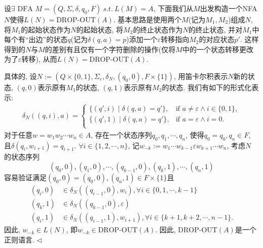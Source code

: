 \documentclass[11pt]{article}
\newenvironment{answer}[1][Answer]{\begin{trivlist}
\item[\hskip \labelsep{\bfseries\itshape#1.}\hskip \labelsep]}{\hfill$\lhd$\end{trivlist}}
\begin{document}
\begin{answer}
    设$\exists \text{ DFA } M = (Q, \Sigma, \delta, q_0, F) ~s.t.~ L(M) = A$, 下面我们从$M$出发构造一个NFA $N$使得$L(N) = \text{DROP-OUT}(A)$. 
    基本思路是使用两个$M$(记为$M_1, M_2$)组成$N$, 将$M_1$的起始状态作为$N$的起始状态, 将$M_2$的终止状态作为$N$的终止状态, 并对$M_1$中每个有“出边”的状态$q$(记为$\delta(q, a) = p$)添加一个$\varepsilon$转移指向$M_2$的对应状态$p'$.
    这样得到的$N$与$M$的差别有且仅有一个字符删除的操作(仅将$M$中的一个状态转移更改为了$\varepsilon$转移), 从而$L(N) = \text{DROP-OUT}(A)$. 
    
    具体的, 设$N := (Q \times \{0,1\}, \Sigma_{\varepsilon}, \delta_N, (q_0, 0), F \times \{1\})$, 用笛卡尔积表示$N$新的状态, $(q, 0)$表示原有$M_1$的状态, $(q, 1)$表示原有$M_2$的状态. 我们有如下的形式化表示:
    \begin{align*}
        \delta_N\left((q,i), a\right) = \begin{cases}
            \{(q', i)\mid \delta(q, a) = q'\}, & \text{if } a \neq \varepsilon \land i \in \{0,1\},\\
            \{(q', 1)\mid \delta(q, a) = q'\}, & \text{if } a = \varepsilon \land i = 0.\\
        \end{cases}
    \end{align*}
    对于任意$w = w_1 w_2 \cdots w_n \in A$, 存在一个状态序列$q_0, q_1, \cdots, q_n$, 使得$q_0 = q_0, q_n \in F$, 且$\delta(q_i, w_{i+1}) = q_{i+1}$. $\forall i \in \{1, 2, \cdots, n\}$, 记$w_{-k} := w_1\cdots w_{k-1}\varepsilon w_{k+1}\cdots w_n$, 考虑$N$ 的状态序列
    \[(q_0,0), (q_1, 0), \cdots, (q_{k-1},0), (q_k, 1),\cdots, (q_n,1)\]
    容易验证满足$(q_0,0) = (q_0,0), (q_n, 1) \in F \times \{1\}$且 
    \begin{align*}
        (q_i,0) & \in \delta_N((q_{i-1},0), w_i), \forall i \in \{0, 1, \cdots, k-1\}  \\
        (q_k,1) & \in \delta_N((q_{k-1},0), \varepsilon) \\
        (q_i,1) & \in \delta_N((q_{i-1},1), w_{i+1}), \forall i \in \{k+1, k+2, \cdots, n-1\}.
    \end{align*}
    因此, $w_{-k} \in L(N)$, 即$w_{-k} \in \text{DROP-OUT}(A)$. 因此, $\text{DROP-OUT}(A)$是一个正则语言.
\end{answer}
\end{document}
